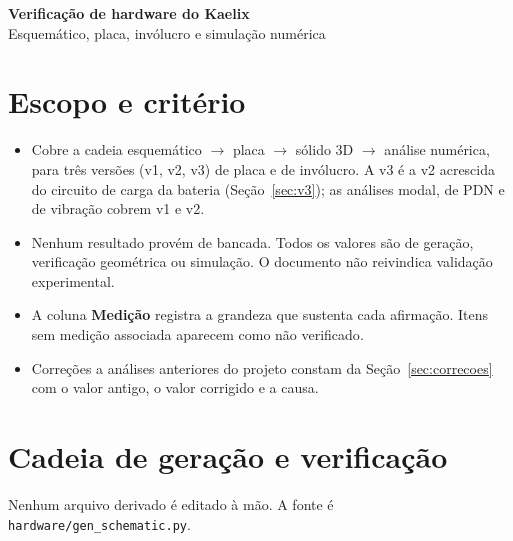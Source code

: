 \documentclass[10pt,a4paper,landscape]{article}
\begin{document}
\begin{center}
{\Large\bfseries Verificação de hardware do Kaelix}\\[2pt]
{\large Esquemático, placa, invólucro e simulação numérica}
\end{center}

\vspace{2pt}

\section{Escopo e critério}

\begin{itemize}
\item Cobre a cadeia esquemático $\rightarrow$ placa $\rightarrow$ sólido 3D $\rightarrow$ análise numérica, para três versões (v1, v2, v3) de placa e de invólucro. A v3 é a v2 acrescida do circuito de carga da bateria (Seção~\ref{sec:v3}); as análises modal, de PDN e de vibração cobrem v1 e v2.
\item Nenhum resultado provém de bancada. Todos os valores são de geração, verificação geométrica ou simulação. O documento não reivindica validação experimental.
\item A coluna \textbf{Medição} registra a grandeza que sustenta cada afirmação. Itens sem medição associada aparecem como \textsf{não verificado}.
\item Correções a análises anteriores do projeto constam da Seção~\ref{sec:correcoes} com o valor antigo, o valor corrigido e a causa.
\end{itemize}

\section{Cadeia de geração e verificação}

Nenhum arquivo derivado é editado à mão. A fonte é \texttt{hardware/gen\_schematic.py}.
\end{document}
